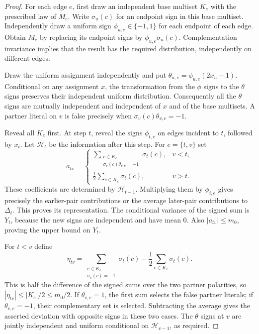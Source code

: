 \documentclass[11pt,a4paper]{article}
\theoremstyle{definition}
\theoremstyle{remark}
\begin{document}
\begin{proof}
For each edge $e$, first draw an independent base multiset $K_e$ with
the prescribed law of $M_e$. Write $\sigma_u(c)$ for an endpoint sign
in this base multiset. Independently draw a uniform sign $\phi_{u,e}\in\{-1,1\}$ for
each endpoint of each edge. Obtain $M_e$ by replacing its endpoint signs
by $\phi_{u,e}\sigma_u(c)$. Complementation invariance implies that the
result has the required distribution, independently on different edges.

Draw the uniform assignment independently and put
$\theta_{u,e}=\phi_{u,e}(2x_u-1)$. Conditional on any assignment $x$,
the transformation from the $\phi$ signs to the $\theta$ signs preserves
their independent uniform distribution. Consequently all the $\theta$ signs
are mutually independent and independent of $x$ and of the base multisets.
A partner literal on $v$ is false precisely when
$\sigma_v(c)\theta_{v,e}=-1$.

Reveal all $K_e$ first. At step $t$, reveal the signs $\phi_{t,e}$ on
edges incident to $t$, followed by $x_t$. Let $\mathcal H_t$ be the
information after this step. For $e=\{t,v\}$ set
\[
 a_{tv}=
 \begin{cases}
 \displaystyle\sum_{\substack{c\in K_e\\
                    \sigma_v(c)\theta_{v,e}=-1}}\sigma_t(c),&v<t,\\[6pt]
 \displaystyle\frac12\sum_{c\in K_e}\sigma_t(c),&v>t.
 \end{cases}
\]
These coefficients are determined by $\mathcal H_{t-1}$. Multiplying
them by $\phi_{t,e}$ gives precisely the earlier-pair contributions or
the average later-pair contributions to $\Delta_t$. This proves its
representation. The conditional variance of the signed sum is $Y_t$,
because the new signs are independent and have mean $0$. Also
$|a_{tv}|\le m_0$, proving the upper bound on $Y_t$.

For $t<v$ define
\[
 \eta_{tv}=
 \sum_{\substack{c\in K_e\\\sigma_v(c)=-1}}\sigma_t(c)
       -\frac12\sum_{c\in K_e}\sigma_t(c).
\]
This is half the difference of the signed sums over the two partner
polarities, so $|\eta_{tv}|\le |K_e|/2\le m_0/2$.
If $\theta_{v,e}=1$, the first sum selects the false partner literals;
if $\theta_{v,e}=-1$, their complementary set is selected.
Subtracting the average gives the asserted deviation with opposite signs
in these two cases. The $\theta$ signs at $v$ are jointly independent
and uniform conditional on $\mathcal H_{v-1}$, as required.
\end{proof}
\end{document}

